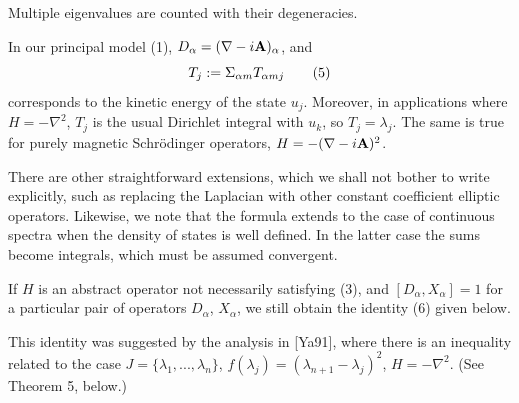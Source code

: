 \roster
\item Multiple eigenvalues are counted with their degeneracies.
\item In our principal model (1), 
$D_{\alpha} = (\nabla - i {\bold A})_{\alpha}$, 
and 
$$T_j := \Sigma _{\alpha m} T_{\alpha m j}                                                                                     
\tag 5$$
corresponds to the kinetic energy of the state $u_j$.  
Moreover, in applications 
where 
$H = - \nabla ^2$, $T_j$ 
is the usual Dirichlet integral with $u_k$, so $T_j = 
\lambda_{j}$.  The same is true for purely magnetic Schr\"odinger 
operators, $H = -(\nabla - i {\bold A})^2$.  
\item There are other straightforward extensions, 
which we shall not bother to 
write explicitly, such as replacing the Laplacian with other constant 
coefficient elliptic operators.  
Likewise, we note that the formula extends to 
the case of continuous spectra when the density of 
states is well defined.  In 
the latter case the sums become integrals, which must be assumed 
convergent. 
\item If $H$ is an abstract operator not necessarily satisfying (3), and 
$[D_{\alpha} ,X_{\alpha}] = 1$ for a particular pair of operators 
$D_{\alpha}$, 
$X_{\alpha}$, we still obtain the identity (6) given below.
\item This identity was suggested by the analysis in [Ya91], 
where there is an 
inequality related to the case 
$J = \{\lambda_1, ..., \lambda_n\}$, 
$f(\lambda_j) = (\lambda_{n+1} - \lambda_j)^2$, $H = -\nabla^2$.  
(See Theorem 5, below.)  
\endroster
\endremark

